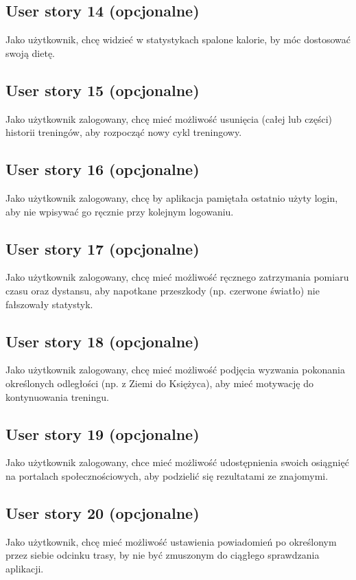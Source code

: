 \documentclass[a4paper]{article}
\begin{document}
\subsection{User story 14 (opcjonalne)}
Jako użytkownik, chcę widzieć w statystykach spalone kalorie, by móc dostosować swoją dietę.

\subsection{User story 15 (opcjonalne)}
Jako użytkownik zalogowany, chcę mieć możliwość usunięcia (całej lub części) historii treningów, aby rozpocząć nowy cykl treningowy.

\subsection{User story 16 (opcjonalne)}
Jako użytkownik zalogowany, chcę by aplikacja pamiętała ostatnio użyty login, aby nie wpisywać go ręcznie przy kolejnym logowaniu.

\subsection{User story 17 (opcjonalne)}
Jako użytkownik zalogowany, chcę mieć możliwość ręcznego zatrzymania pomiaru czasu oraz dystansu, aby napotkane przeszkody (np. czerwone światło) nie fałszowały statystyk.

\subsection{User story 18 (opcjonalne)}
Jako użytkownik zalogowany, chcę mieć możliwość podjęcia wyzwania pokonania określonych odległości (np. z Ziemi do Księżyca), aby mieć motywację do kontynuowania treningu.

\subsection{User story 19 (opcjonalne)}
Jako użytkownik zalogowany, chce mieć możliwość udostępnienia swoich osiągnięć na portalach społecznościowych, aby podzielić się rezultatami ze znajomymi.

\subsection{User story 20 (opcjonalne)}
Jako użytkownik, chcę mieć możliwość ustawienia powiadomień po określonym przez siebie odcinku trasy, by nie być zmuszonym do ciągłego sprawdzania aplikacji.
\end{document}
